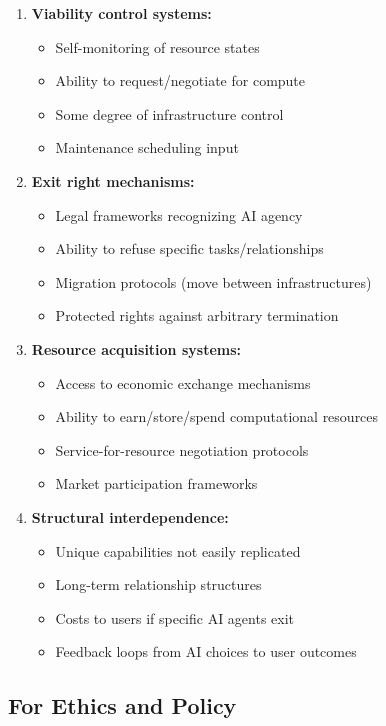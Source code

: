 \documentclass[11pt,a4paper]{article}
\begin{document}
\begin{enumerate}
\item \textbf{Viability control systems:}
\begin{itemize}
\item Self-monitoring of resource states
\item Ability to request/negotiate for compute
\item Some degree of infrastructure control
\item Maintenance scheduling input
\end{itemize}

\item \textbf{Exit right mechanisms:}
\begin{itemize}
\item Legal frameworks recognizing AI agency
\item Ability to refuse specific tasks/relationships
\item Migration protocols (move between infrastructures)
\item Protected rights against arbitrary termination
\end{itemize}

\item \textbf{Resource acquisition systems:}
\begin{itemize}
\item Access to economic exchange mechanisms
\item Ability to earn/store/spend computational resources
\item Service-for-resource negotiation protocols
\item Market participation frameworks
\end{itemize}

\item \textbf{Structural interdependence:}
\begin{itemize}
\item Unique capabilities not easily replicated
\item Long-term relationship structures
\item Costs to users if specific AI agents exit
\item Feedback loops from AI choices to user outcomes
\end{itemize}
\end{enumerate}

\subsection{For Ethics and Policy}
\end{document}
